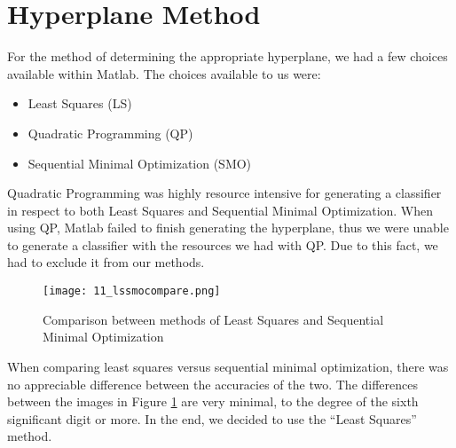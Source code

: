 \section{Hyperplane Method}

For the method of determining the appropriate hyperplane, we had a few choices available within Matlab. The choices available to us were:

\begin{itemize}
  \item Least Squares (LS)
  \item Quadratic Programming (QP)
  \item Sequential Minimal Optimization (SMO)
\end{itemize}

Quadratic Programming was highly resource intensive for generating a classifier in respect to both Least Squares and Sequential Minimal Optimization. When using QP, Matlab failed to finish generating the hyperplane, thus we were unable to generate a classifier with the resources we had with QP. Due to this fact, we had to exclude it from our methods.

\begin{figure}[ht]
    \centering
    \texttt{[image: 11\_lssmocompare.png]}
    \caption{Comparison between methods of Least Squares and Sequential Minimal Optimization}
    \label{fig:11_lssmocompare}
\end{figure}

When comparing least squares versus sequential minimal optimization, there was no appreciable difference between the accuracies of the two. The differences between the images in Figure \ref{fig:11_lssmocompare} are very minimal, to the degree of the sixth significant digit or more. In the end, we decided to use the ``Least Squares'' method.

